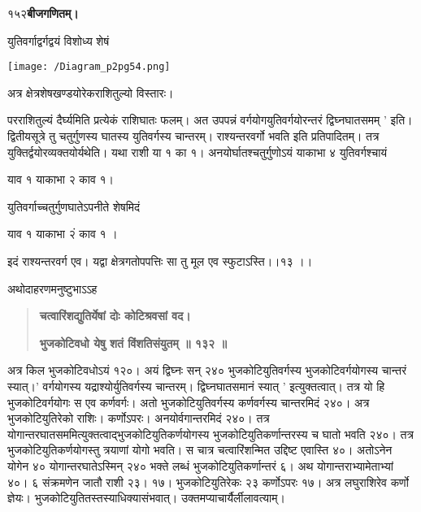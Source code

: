 \documentclass[11pt, openany]{book}
\begin{document}
\onehalfspacing
१५२\hspace{2in}\textbf{बीजगणितम्।} 

\vspace{5mm}

\begin{sloppypar}
\hangindent=0.2in \hspace{0.2in}युतिवर्गाद्वर्गद्वयं विशोध्य शेषं

\begin{center}
    \texttt{[image: /Diagram\_p2pg54.png]}
\end{center}

\hangindent=0.2in \hspace{0.2in}अत्र क्षेत्रशेषखण्डयोरेकराशितुल्यो विस्तारः।

\hangindent=0.2in \hspace{0.2in}परराशितुल्यं दैर्घ्यमिति प्रत्येकं राशिघातः फलम्। अत उपपन्नं वर्गयोगयुतिवर्गयोरन्तरं द्विघ्नघातसमम् ' इति। द्वितीयसूत्रे तु चतुर्गुणस्य घातस्य युतिवर्गस्य चान्तरम्। राश्यन्तरवर्गो भवति इति प्रतिपादितम्। तत्र युक्तिर्द्वयोरव्यक्तयोर्यथेति। यथा राशी या १ का १। अनयोर्घातश्चतुर्गुणोऽयं याकाभा ४ युतिवर्गश्चायं 
\begin{center}
याव १ याकाभा २ काव १।
\end{center}
\hangindent=0.2in \hspace{0.2in}युतिवर्गाच्चतुर्गुणघातेऽपनीते शेषमिदं
\begin{center}
 याव १ याकाभा २ं काव १ ।
\end{center}
\hangindent=0.2in \hspace{0.2in}इदं राश्यन्तरवर्ग एव। यद्वा क्षेत्रगतोपपत्तिः सा तु मूल एव स्फुटाऽस्ति।।१३ ।।

\hangindent=0.2in \hspace{0.2in}अथोदाहरणमनुष्टुभाऽऽह\textendash

\begin{quote}
\hspace{1in}\textbf{चत्वारिंशद्युतिर्येषां दोः कोटिश्रवसां वद।}

\hspace{1in}\textbf{भुजकोटिवधो येषु शतं विंशतिसंयुतम् ॥ १३२ ॥}
\end{quote}

\hangindent=0.2in \hspace{0.2in}अत्र किल भुजकोटिवधोऽयं १२०। अयं द्विघ्नः सन् २४० भुजकोटियुतिवर्गस्य भुजकोटिवर्गयोगस्य चान्तरं स्यात्।' वर्गयोगस्य यद्राश्योर्युतिवर्गस्य चान्तरम्। द्विघ्नघातसमानं स्यात् ' इत्युक्तत्वात्। तत्र यो हि भुजकोटिवर्गयोगः स एव कर्णवर्गः। अतो भुजकोटियुतिवर्गस्य कर्णवर्गस्य चान्तरमिदं २४०। अत्र भुजकोटियुतिरेको राशिः। कर्णोऽपरः। अनयोर्वगान्तरमिदं २४०। तत्र योगान्तरघातसममित्युक्तत्वाद्भुजकोटियुतिकर्णयोगस्य भुजकोटियुतिकर्णान्तरस्य च घातो भवति २४०। तत्र भुजकोटियुतिकर्णयोगस्तु त्रयाणां योगो भवति। स चात्र चत्वारिंशन्मित उद्दिष्ट एवास्ति ४०। अतोऽनेन योगेन ४० योगान्तरघातेऽस्मिन् २४० भक्ते लब्धं भुजकोटियुतिकर्णान्तरं ६। अथ योगान्तराभ्यामेताभ्यां ४०। ६ संक्रमणेन जातौ राशी २३। १७। भुजकोटियुतिरेकः २३ कर्णोऽपरः १७। अत्र लघुराशिरेव कर्णो ज्ञेयः। भुजकोटियुतितस्तस्याधिक्यासंभवात्। उक्तमप्याचार्यैर्लीलावत्याम्।
\end{sloppypar}
\thispagestyle{empty}
\newpage
\end{document}
